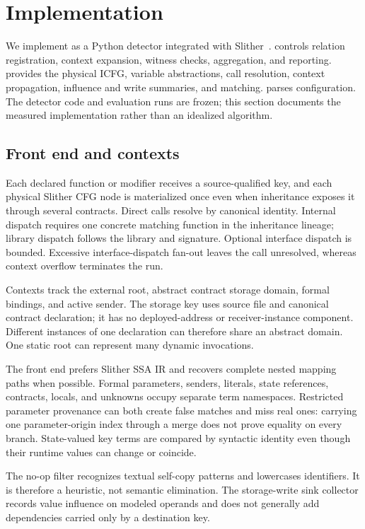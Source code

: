 \section{Implementation}
\label{s:implementation}

We implement \sys as a Python detector integrated with Slither~\cite{feist2019slither}.  controls relation registration, context expansion, witness checks, aggregation, and reporting.  provides the physical ICFG, variable abstractions, call resolution, context propagation, influence and write summaries, and matching.  parses configuration. The detector code and evaluation runs are frozen; this section documents the measured implementation rather than an idealized algorithm.

\subsection{Front end and contexts}

Each declared function or modifier receives a source-qualified key, and each physical Slither CFG node is materialized once even when inheritance exposes it through several contracts. Direct calls resolve by canonical identity. Internal dispatch requires one concrete matching function in the inheritance lineage; library dispatch follows the library and signature. Optional interface dispatch is bounded. Excessive interface-dispatch fan-out leaves the call unresolved, whereas context overflow terminates the run.

Contexts track the external root, abstract contract storage domain, formal bindings, and active sender. The storage key uses source file and canonical contract declaration; it has no deployed-address or receiver-instance component. Different instances of one declaration can therefore share an abstract domain. One static root can represent many dynamic invocations.

The front end prefers Slither SSA IR and recovers complete nested mapping paths when possible. Formal parameters, senders, literals, state references, contracts, locals, and unknowns occupy separate term namespaces. Restricted parameter provenance can both create false matches and miss real ones: carrying one parameter-origin index through a merge does not prove equality on every branch. State-valued key terms are compared by syntactic identity even though their runtime values can change or coincide.

The no-op filter recognizes textual self-copy patterns and lowercases identifiers. It is therefore a heuristic, not semantic elimination. The storage-write sink collector records value influence on modeled operands and does not generally add dependencies carried only by a destination key.

